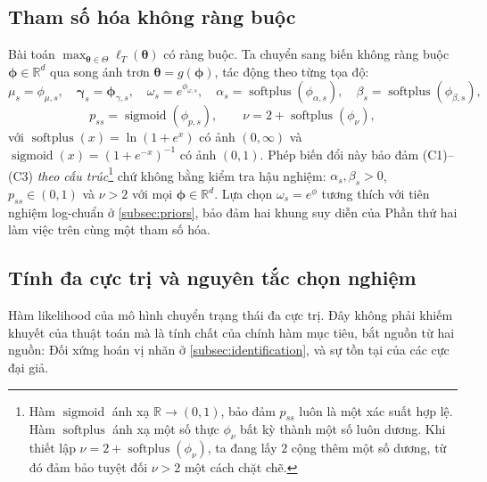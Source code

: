 \documentclass[12pt,a4paper]{article}
\numberwithin{equation}{section}
\theoremstyle{definition}
\newcommand{\R}{\mathbb{R}}
\newcommand{\softplus}{\operatorname{softplus}}
\newcommand{\sigmoid}{\operatorname{sigmoid}}
\newcommand{\Param}{\symbf{\theta}}
\newcommand{\bmgamma}{\symbf{\gamma}}
\newcommand{\vecphi}{\symbf{\phi}}
\begin{document}
	\subsection{Tham số hóa không ràng buộc}\label{subsec:reparam}
	Bài toán $\max_{\Param\in\Theta}\ell_T(\Param)$ có ràng buộc. Ta chuyển sang biến không
	ràng buộc $\vecphi\in\R^{d}$ qua song ánh trơn $\Param=g(\vecphi)$, tác động theo từng
	tọa độ:
	\begin{equation}
		\mu_s=\phi_{\mu,s},\quad
		\bmgamma_s=\vecphi_{\gamma,s},\quad
		\omega_s=e^{\phi_{\omega,s}},\quad
		\alpha_s=\softplus(\phi_{\alpha,s}),\quad
		\beta_s=\softplus(\phi_{\beta,s}),
		\label{eq:transform-positive}
	\end{equation}
	\begin{equation}
		p_{ss}=\sigmoid(\phi_{p,s}),\qquad
		\nu=2+\softplus(\phi_{\nu}),
		\label{eq:transform-bounded}
	\end{equation}
với $\softplus(x)=\ln(1+e^{x})$ có ảnh $(0,\infty)$ và $\sigmoid(x)=(1+e^{-x})^{-1}$ có
ảnh $(0,1)$. Phép biến đổi này bảo đảm (C1)--(C3) \emph{theo cấu trúc}\footnote{Hàm $\sigmoid$ ánh xạ $\R \to (0, 1)$, bảo đảm $p_{ss}$ luôn là một xác suất hợp lệ. Hàm $\softplus$ ánh xạ một số thực $\phi_\nu$ bất kỳ thành một số luôn dương. Khi thiết lập $\nu = 2 + \softplus(\phi_\nu)$, ta đang lấy $2$ cộng thêm một số dương, từ đó đảm bảo tuyệt đối $\nu > 2$ một cách chặt chẽ.} chứ không bằng
kiểm tra hậu nghiệm: $\alpha_s,\beta_s>0$, $p_{ss}\in(0,1)$ và $\nu>2$ với mọi
$\vecphi\in\R^{d}$. Lựa chọn $\omega_s=e^{\phi}$ tương thích với tiên nghiệm log-chuẩn ở
\cref{subsec:priors}, bảo đảm hai khung suy diễn của Phần thứ hai làm việc trên cùng một
tham số hóa.
	
	\subsection{Tính đa cực trị và nguyên tắc chọn nghiệm}\label{subsec:multimodality}
	Hàm likelihood của mô hình chuyển trạng thái đa cực trị. Đây không phải khiếm khuyết của
	thuật toán mà là tính chất của chính hàm mục tiêu, bắt nguồn từ hai nguồn: Đối xứng hoán
	vị nhãn ở \cref{subsec:identification}, và sự tồn tại của các cực đại giả.
	
\end{document}
